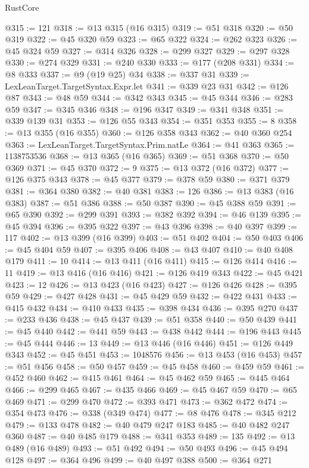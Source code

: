 \begin{lexlean}{RustCore}
\begin{coremodule}
@315 := 121
@318 := @13 @315 (@16 @315)
@319 := @51 @318
@320 := @50 @319
@322 := @45 @320 @59
@323 := @65 @322
@324 := @262 @323
@326 := @45 @324 @59
@327 := @314 @326
@328 := @299 @327
@329 := @297 @328
@330 := @274 @329
@331 := @240 @330
@333 := @177 (@208 @331)
@334 := @8 @333
@337 := @9 (@19 @25) @34
@338 := @337 @31
@339 := LexLeanTarget.TargetSyntax.Expr.let
@341 := @339 @23 @31
@342 := @126 @87
@343 := @48 @59
@344 := @342 @343
@345 := @45 @344
@346 := @283 @59
@347 := @345 @346
@348 := @196 @347
@349 := @341 @348
@351 := @339 @139 @31
@353 := @126 @55 @343
@354 := @351 @353
@355 := 8
@358 := @13 @355 (@16 @355)
@360 := @126 @358 @343
@362 := @40 @360 @254
@363 := LexLeanTarget.TargetSyntax.Prim.natLe
@364 := @41 @363
@365 := 1138753536
@368 := @13 @365 (@16 @365)
@369 := @51 @368
@370 := @50 @369
@371 := @45 @370
@372 := 9
@375 := @13 @372 (@16 @372)
@377 := @126 @375 @343
@378 := @45 @377
@379 := @378 @59
@380 := @371 @379
@381 := @364 @380
@382 := @40 @381
@383 := 126
@386 := @13 @383 (@16 @383)
@387 := @51 @386
@388 := @50 @387
@390 := @45 @388 @59
@391 := @65 @390
@392 := @299 @391
@393 := @382 @392
@394 := @46 @139
@395 := @45 @394
@396 := @395 @322
@397 := @43 @396
@398 := @40 @397
@399 := 117
@402 := @13 @399 (@16 @399)
@403 := @51 @402
@404 := @50 @403
@406 := @45 @404 @59
@407 := @395 @406
@408 := @43 @407
@410 := @40 @408 @179
@411 := 10
@414 := @13 @411 (@16 @411)
@415 := @126 @414
@416 := 11
@419 := @13 @416 (@16 @416)
@421 := @126 @419 @343
@422 := @45 @421
@423 := 12
@426 := @13 @423 (@16 @423)
@427 := @126 @426
@428 := @395 @59
@429 := @427 @428
@431 := @45 @429 @59
@432 := @422 @431
@433 := @415 @432
@434 := @410 @433
@435 := @398 @434
@436 := @395 @270
@437 := @233 @436
@438 := @45 @437
@439 := @51 @358
@440 := @50 @439
@441 := @45 @440
@442 := @441 @59
@443 := @438 @442
@444 := @196 @443
@445 := @45 @444
@446 := 13
@449 := @13 @446 (@16 @446)
@451 := @126 @449 @343
@452 := @45 @451
@453 := 1048576
@456 := @13 @453 (@16 @453)
@457 := @51 @456
@458 := @50 @457
@459 := @45 @458
@460 := @459 @59
@461 := @452 @460
@462 := @415 @461
@464 := @45 @462 @59
@465 := @445 @464
@466 := @299 @465
@467 := @435 @466
@469 := @45 @467 @59
@470 := @65 @469
@471 := @299 @470
@472 := @393 @471
@473 := @362 @472
@474 := @354 @473
@476 := @338 (@349 @474)
@477 := @8 @476
@478 := @345 @212
@479 := @133 @478
@482 := @40 @479 @247 @183
@485 := @40 @482 @247 @360
@487 := @40 @485 @179
@488 := @341 @353
@489 := 135
@492 := @13 @489 (@16 @489)
@493 := @51 @492
@494 := @50 @493
@496 := @45 @494 @128
@497 := @364 @496
@499 := @40 @497 @388
@500 := @364 @271

\end{coremodule}
\end{lexlean}
